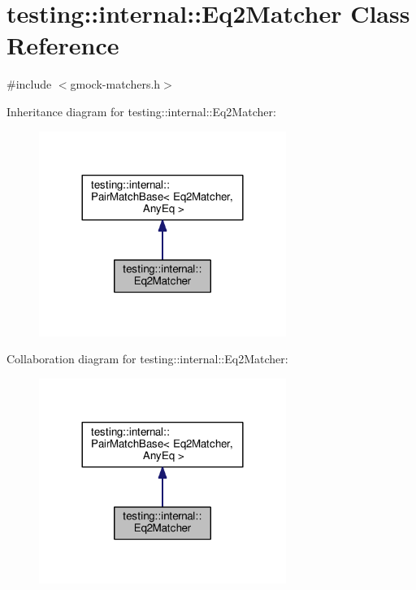 \hypertarget{classtesting_1_1internal_1_1Eq2Matcher}{}\section{testing\+:\+:internal\+:\+:Eq2\+Matcher Class Reference}
\label{classtesting_1_1internal_1_1Eq2Matcher}


{\ttfamily \#include $<$gmock-\/matchers.\+h$>$}



Inheritance diagram for testing\+:\+:internal\+:\+:Eq2\+Matcher\+:
\nopagebreak
\begin{figure}[H]
\begin{center}
\leavevmode
\includegraphics[width=228pt]{classtesting_1_1internal_1_1Eq2Matcher__inherit__graph}
\end{center}
\end{figure}


Collaboration diagram for testing\+:\+:internal\+:\+:Eq2\+Matcher\+:
\nopagebreak
\begin{figure}[H]
\begin{center}
\leavevmode
\includegraphics[width=228pt]{classtesting_1_1internal_1_1Eq2Matcher__coll__graph}
\end{center}
\end{figure}
